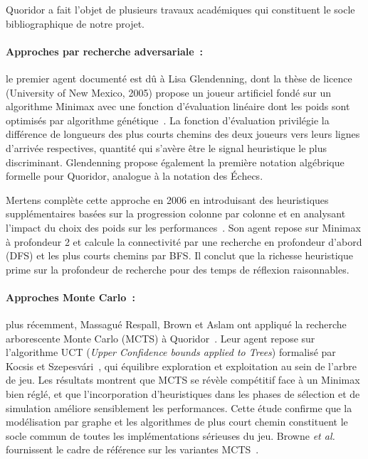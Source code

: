 \documentclass[a4paper]{article}
\begin{document}
Quoridor a fait l'objet de plusieurs travaux académiques qui
constituent le socle bibliographique de notre projet.

\paragraph{Approches par recherche adversariale~:}
le premier agent documenté est dû à Lisa Glendenning, dont la thèse de
licence (University of New Mexico, 2005) propose un joueur artificiel
fondé sur un algorithme Minimax avec une fonction d'évaluation linéaire
dont les poids sont optimisés par algorithme génétique~\cite{glendenning2005}.
La fonction d'évaluation privilégie la différence de longueurs des plus
courts chemins des deux joueurs vers leurs lignes d'arrivée
respectives, quantité qui s'avère être le signal heuristique le plus
discriminant. Glendenning propose également la première notation
algébrique formelle pour Quoridor, analogue à la notation des Échecs.

Mertens complète cette approche en 2006 en introduisant des
heuristiques supplémentaires basées sur la progression colonne par
colonne et en analysant l'impact du choix des poids sur les
performances~\cite{mertens2006}. Son agent repose sur Minimax à
profondeur 2 et calcule la connectivité par une recherche en
profondeur d'abord (DFS) et les plus courts chemins par BFS.
Il conclut que la richesse heuristique prime sur la profondeur de
recherche pour des temps de réflexion raisonnables.

\paragraph{Approches Monte Carlo~:}
plus récemment, Massagué Respall, Brown et Aslam ont appliqué la
recherche arborescente Monte Carlo (MCTS) à Quoridor~\cite{respall2018}.
Leur agent repose sur l'algorithme UCT (\emph{Upper Confidence bounds
applied to Trees}) formalisé par Kocsis et Szepesvári~\cite{kocsis2006uct},
qui équilibre exploration et exploitation au sein de l'arbre de jeu.
Les résultats montrent que MCTS se révèle compétitif face à un Minimax
bien réglé, et que l'incorporation d'heuristiques dans les phases de
sélection et de simulation améliore sensiblement les performances. Cette
étude confirme que la modélisation par graphe et les algorithmes de
plus court chemin constituent le socle commun de toutes les
implémentations sérieuses du jeu. Browne \emph{et al.} fournissent le
cadre de référence sur les variantes MCTS~\cite{browne2012mcts}.
\end{document}

